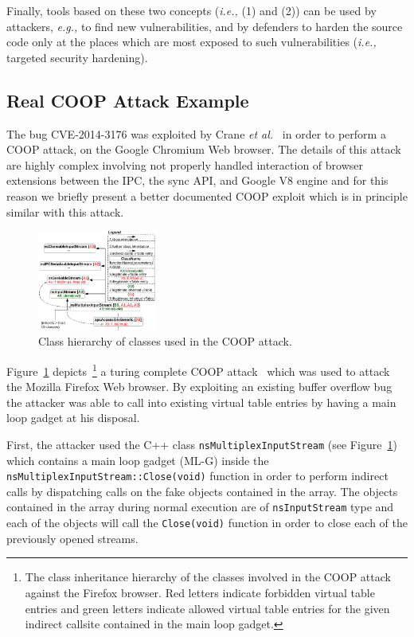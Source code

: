 Finally, tools based on these two concepts (\textit{i.e.,} (1) and (2)) can be used by attackers, \textit{e.g.,} to find new vulnerabilities, and by defenders
to harden the source code only at the places which are most exposed to such vulnerabilities (\textit{i.e.,} targeted security hardening).

\subsection{Real COOP Attack Example}
\label{Real COOP Attack Example}
The bug CVE-2014-3176 was exploited by Crane \textit{et al.}~\cite{crane:readactor++} in order to perform a
COOP attack, on the Google Chromium Web browser. The details of this attack are highly complex involving not properly 
handled interaction of browser extensions between the IPC, the sync API, and Google V8 engine and for this reason we briefly present a better
documented COOP exploit which is in principle similar with this attack.

\label{Running Example: CVE X}
\begin{figure}[h!]
    \centering
    \includegraphics[width=0.35\textwidth]{figures/class_hierarchy.pdf}
\caption{Class hierarchy of classes used in the COOP attack.}
\label{Class exploit}
\vspace{-.29cm}
\end{figure}
Figure~\ref{Class exploit} depicts~\footnote{The class inheritance hierarchy of the classes involved in the COOP attack against the Firefox browser. Red letters 
indicate forbidden virtual table entries and green letters indicate allowed virtual table entries for the given indirect callsite
contained in the main loop gadget.} a turing complete COOP attack~\cite{schuster:coop} which was used to attack the Mozilla Firefox Web browser. 
By exploiting an existing buffer overflow bug the attacker was able to call into existing virtual table entries by having a main loop gadget at his disposal.

First, the attacker used the C++ class \texttt{nsMultiplexInputStream} (see Figure~\ref{Class exploit}) which contains a 
main loop gadget (ML-G) inside the \texttt{nsMultiplexInputStream::Close(void)} 
function in order to perform indirect calls by dispatching calls on the fake objects contained in the array. The objects 
contained in the array during normal execution are of \texttt{nsInputStream} type and each of the objects will call the 
\texttt{Close(void)} function in order to close each of the previously opened streams. 

